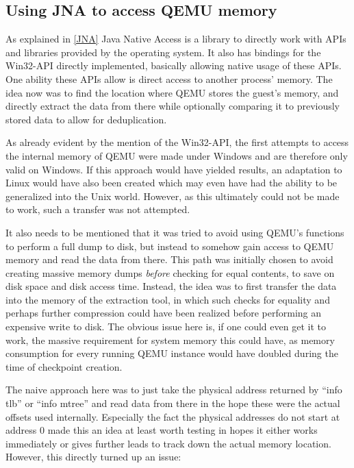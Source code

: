 \subsection{Using JNA to access QEMU memory}\label{sec:JNA_failure}
As explained in \autoref{JNA} Java Native Access is a library to directly work with APIs and libraries provided by the operating system.
It also has bindings for the Win32-API directly implemented,
basically allowing native usage of these APIs.
One ability these APIs allow is direct access to another process' memory.
The idea now was to find the location where QEMU stores the guest's memory,
and directly extract the data from there while optionally comparing it to previously stored data
to allow for deduplication.

As already evident by the mention of the Win32-API,
the first attempts to access the internal memory of QEMU were made under Windows
and are therefore only valid on Windows.
If this approach would have yielded results,
an adaptation to Linux would have also been created
which may even have had the ability to be generalized into the Unix world.
However, as this ultimately could not be made to work,
such a transfer was not attempted.

It also needs to be mentioned that it was tried to avoid using QEMU's functions to perform a full dump to disk,
but instead to somehow gain access to QEMU memory and read the data from there.
This path was initially chosen to avoid creating massive memory dumps \emph{before} checking for equal contents,
to save on disk space and disk access time.
Instead, the idea was to first transfer the data into the memory of the extraction tool,
in which such checks for equality and perhaps further compression could have been realized
before performing an expensive write to disk.
The obvious issue here is, if one could even get it to work,
the massive requirement for system memory this could have,
as memory consumption for every running QEMU instance would have doubled
during the time of checkpoint creation.

The naive approach here was to just take the physical address returned by \enquote{info tlb} or \enquote{info mtree}
and read data from there in the hope these were the actual offsets used internally.
Especially the fact the physical addresses do not start at address 0
made this an idea at least worth testing
in hopes it either works immediately or gives further leads to track down the actual memory location.
However, this directly turned up an issue:


